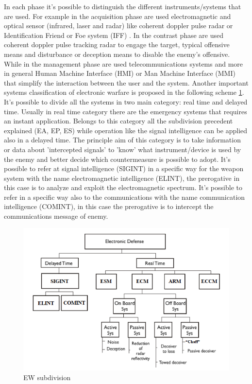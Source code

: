 \documentclass[12pt]{report}
\begin{document}
In each phase it's possible to distinguish the different instruments/systems that are used. For example in the acquisition phase are used electromagnetic and optical sensor (infrared, laser and radar) like coherent doppler pulse radar or Identification Friend or Foe system (IFF) . In the contrast phase are used coherent doppler pulse tracking radar to engage the target, typical offensive means and disturbance or deception means to disable the enemy's offensive. While in the management phase are used telecommunications systems and more in general Human Machine Interface (HMI) or Man Machine Interface (MMI) that simplify the interaction between the user and the system. Another important systems classification of electronic warfare is proposed in the following scheme \ref{EWsubdivision}. It's possible to divide all the systems in two main category: real time and delayed time. 
Usually in real time category there are the emergency systems that requires an instant application. Belongs to this category all the subdivision precedent explained (EA, EP, ES) while operation like the signal intelligence can be applied also in a delayed time. The principle aim of this category is to take information or data about 'intercepted signals' to 'know' what instrument/device is used by the enemy and better decide which countermeasure is possible to adopt. It's possible to refer at signal intelligence (SIGINT) in a specific way for the weapon system with the name electromagnetic intelligence (ELINT), the prerogative in this case is to analyze and exploit the electromagnetic spectrum. It's possible to refer in a specific way also to the communications with the name communication intelligence (COMINT), in this case the prerogative is to intercept the communications message of enemy. 

\begin{figure}[h!]
    \centering
    \includegraphics[width=12cm]{Pictures/EW subdivision.png}
    \caption{EW subdivision}
    \label{EWsubdivision}
\end{figure} 
\end{document}
